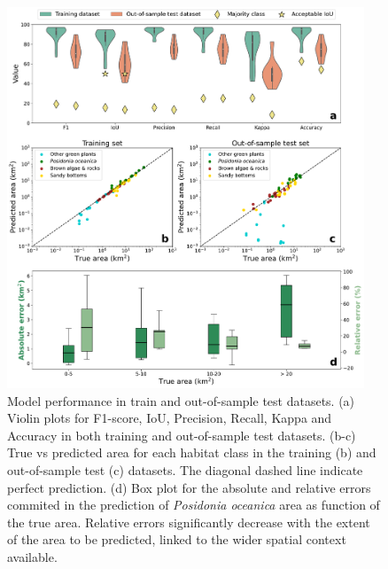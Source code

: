 \begin{figure}[H]
    \centering
    \includegraphics[width=0.95\textwidth]{Figures/Model_performance.pdf}
    \caption[Model performance in train and out-of-sample test datasets]{Model
        performance in train and out-of-sample test datasets. (a)
        Violin plots for F1-score, IoU, Precision, Recall, Kappa and Accuracy
        in both
        training and out-of-sample test datasets. (b-c) True vs predicted area
        for each
        habitat class in the training (b) and out-of-sample test (c) datasets.
        The
        diagonal dashed line indicate perfect prediction. (d) Box plot for the
        absolute
        and relative errors commited in the prediction of \textit{Posidonia
            oceanica}
        area as function of the true area. Relative errors significantly
        decrease with
        the extent of the area to be predicted, linked to the wider spatial
        context
        available.}
    \label{fig:model_performance}
\end{figure}

